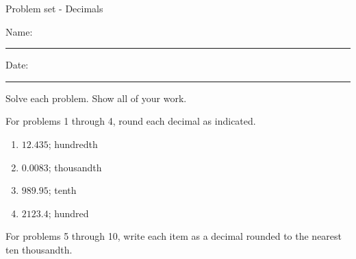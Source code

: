 \documentclass[12pt]{article}
\begin{document}
\pagestyle{empty} %
\begin{center}
          Problem set - Decimals \\[0.5in]
\end{center}
Name: \rule{4in}{0.005in} Date: \rule{1.5in}{0.005in} 
  \vspace{0.25in}

Solve each problem. Show all of your work. 

For problems 1 through 4, round each decimal as indicated. 
\begin{multicols}{2}
\begin{enumerate}

    \item \hspace{0.250in} $12.435$; hundredth
  \vspace{0.25in}

    \item \hspace{0.250in} $0.0083$; thousandth
  \vspace{0.25in}

    \item \hspace{0.250in} $989.95$; tenth
  \vspace{0.25in}

    \item \hspace{0.250in} $2123.4$; hundred
  \vspace{0.25in}

\end{enumerate}
\end{multicols}
For problems 5 through 10, write each item as a decimal rounded to the nearest ten thousandth.
\end{document}
